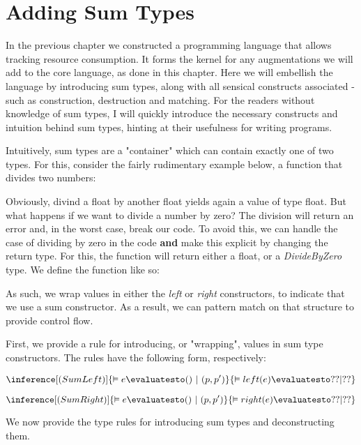 \chapter{Adding Sum Types}

In the previous chapter we constructed a programming language that allows tracking resource consumption. It forms the kernel for any augmentations we will add to the core language, as done in this chapter. Here we will embellish the language by introducing sum types, along with all sensical constructs associated - such as construction, destruction and matching. For the readers without knowledge of sum types, I will quickly introduce the necessary constructs and intuition behind sum types, hinting at their usefulness for writing programs. 

Intuitively, sum types are a "container" which can contain exactly one of two types. For this, consider the fairly rudimentary example below, a function that divides two numbers:


Obviously, divind a float by another float yields again a value of type float. But what happens if we want to divide a number by zero? The division will return an error and, in the worst case, break our code. To avoid this, we can handle the case of dividing by zero in the code \textbf{and} make this explicit by changing the return type. For this, the function will return either a float, or a \emph{DivideByZero} type. We define the function like so:


As such, we wrap values in either the \emph{left} or \emph{right} constructors, to indicate that we use a sum constructor. As a result, we can pattern match on that structure to provide control flow. 


First, we provide a rule for introducing, or "wrapping", values in sum type constructors. The rules have the following form, respectively:

\[
   \inference[(SumLeft)]
   {\vDash e \evaluatesto ()~|~(p,p')}
   {\vDash left(e) \evaluatesto ?? | ??}
\]

\[
   \inference[(SumRight)]
   {\vDash e \evaluatesto ()~|~(p,p')}
   {\vDash right(e) \evaluatesto ?? | ??}
\]


We now provide the type rules for introducing sum types and deconstructing them.
